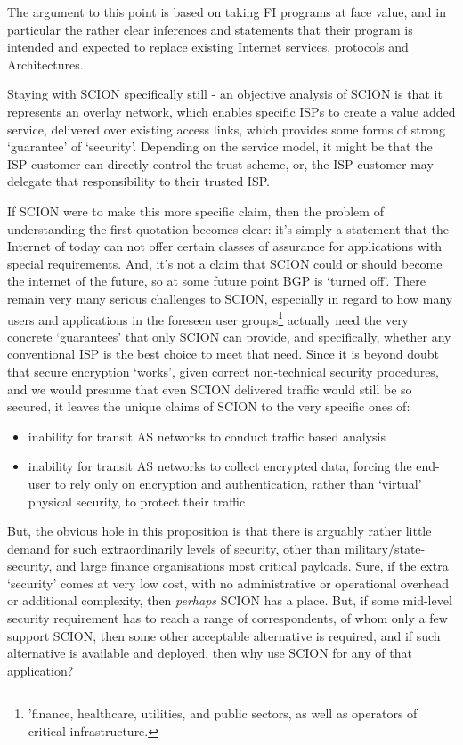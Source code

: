 The argument to this point is based on taking FI programs at face value, and in particular the rather clear inferences and statements that their program is intended and expected to replace existing Internet services, protocols and Architectures.

Staying with SCION specifically still - an objective analysis of SCION is that it represents an overlay network, which enables specific ISPs to create a value added service, delivered over existing access links, which provides some forms of strong `guarantee' of `security'.  Depending on the service model, it might be that the ISP customer can directly control the trust scheme, or, the ISP customer may delegate that responsibility to their trusted ISP.

If SCION were to make this more specific claim, then the problem of understanding the first quotation becomes clear: it's simply a statement that the Internet of today can not offer certain classes of assurance for applications with special requirements.  And, it's not a claim that SCION could or should become the internet of the future, so at some future point BGP is `turned off'.  There remain very many serious challenges to SCION, especially in regard to how many users and applications in the foreseen user groups\footnote{'finance, healthcare, utilities, and public sectors, as well as operators of critical infrastructure.} actually need the very concrete `guarantees' that only SCION can provide, and specifically, whether any conventional ISP is the best choice to meet that need.  Since it is beyond doubt that secure encryption `works', given correct non-technical security procedures, and we would presume that even SCION delivered traffic would still be so secured, it leaves the unique claims of SCION to the very specific ones of:
\begin{itemize}
    \item inability for transit AS networks to conduct traffic based analysis
    \item inability for transit AS networks to collect encrypted data, forcing the end-user to rely only on encryption and authentication, rather than `virtual' physical security, to protect their traffic
\end{itemize}
But, the obvious hole in this proposition is that there is arguably rather little demand for such extraordinarily levels of security, other than military/state-security, and large finance organisations most critical payloads.   Sure, if the extra `security' comes at very low cost, with no administrative or operational overhead or additional complexity, then \emph{perhaps} SCION has a place.  But, if some mid-level security requirement has to reach a range of correspondents, of whom only a few support SCION, then some other acceptable alternative is required, and if such alternative is available and deployed, then why use SCION for any of that application?
